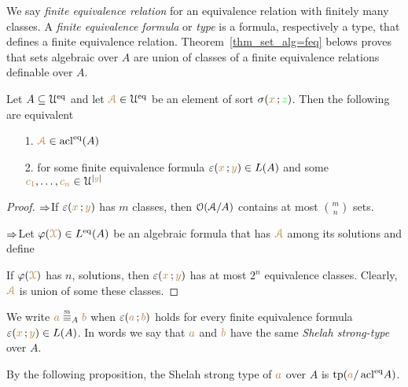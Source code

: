 \documentclass[creche.tex]{subfiles}
\begin{document}
We say \emph{finite equivalence relation\/} for an equivalence relation with finitely many classes.
A \emph{finite equivalence formula\/} or \emph{type\/} is a formula, respectively a type, that defines a finite equivalence relation.
Theorem~\ref{thm_set_alg=feq} belows proves that sets algebraic over $A$ are union of classes of a finite equivalence relations definable over $A$.


\begin{theorem}\label{thm_set_alg=feq}
Let $A\subseteq\EuScript U^{{\rm eq}}$ and let ${\color{brown}\EuScript A}\in\EuScript U^{{\rm eq}}$ be an element of sort $\sigma({\color{brown} x}\,;{\color{green} z})$.
Then the following are equivalent
\begin{itemize}
\item[1.] ${\color{brown}\EuScript A}\in\mathop{\rm acl}^{{\rm eq}}(A)$
\item[2.] for some finite equivalence formula $\varepsilon({\color{brown} x}\,;{\color{brown} y})\in L(A)$ and some ${\color{brown} c_1},\dots,{\color{brown} c_n}\in\EuScript U^{|{\color{brown} y}|}$
\end{itemize}


\end{theorem}
\begin{proof} $\Rightarrow$\quad If  $\varepsilon({\color{brown} x}\,;{\color{brown} y})$ has $m$ classes, then $\EuScript O(\EuScript A/A)$ contains at most $\displaystyle{m\choose n}$ sets.

$\Rightarrow$\quad Let $\varphi({\color{brown}\EuScript X})\in L^{{\rm eq}}(A)$ be an algebraic formula that has ${\color{brown}\EuScript A}$ among its solutions and define


If $\varphi({\color{brown}\EuScript X})$ has $n$, solutions, then $\varepsilon({\color{brown} x}\,;{\color{brown} y})$ has at most $2^n$ equivalence classes.
Clearly, ${\color{brown}\EuScript A}$ is union of some these classes.
\end{proof}

\begin{definition}\label{def_Sh_strong_type}
We write \emph{${\mr a}\stackrel{\smash{\scalebox{.5}{\rm Sh}}}{\equiv}_A{\mr b}$} when $\varepsilon({\color{brown} a}\,;{\color{brown} b})$ holds for every finite equivalence formula $\varepsilon({\color{brown} x}\,;{\color{brown} y})\in L(A)$.
In words we say that ${\color{brown} a}$ and ${\color{brown} b}$ have the same \emph{Shelah strong-type\/} over $A$.\QED
\end{definition}

By the following proposition, the Shelah strong type of ${\color{brown} a}$ over $A$ is ${\rm tp}({\color{brown} a}/\mathop{\rm acl}^{{\rm eq}}\!A)$.
\end{document}
